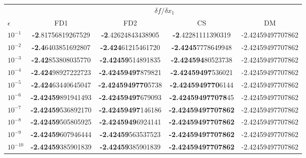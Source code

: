 \documentclass[letterpaper,12pt]{article}
\begin{document}
\begin{table}[h] %
\centering %
\begin{tabular}{p{1cm} c c c c} %
\toprule %
& \multicolumn{4}{c}{$\delta f / \delta x_1$} \\ %
\cmidrule{1-5} %
$\epsilon$ & FD1 & FD2 & CS & DM\\ %
\midrule %
$10^{-1}$ & {\bf-2}.81756819267529 & {\bf-2}.42624843438905 & {\bf-2}.42281111390319 & -2.42459497707862\\
$10^{-2}$ & {\bf-2.4}6403851692807 & {\bf-2.424}61215461720 & {\bf-2.4245}7778649948 & -2.42459497707862\\
$10^{-3}$ & {\bf-2.42}853808035770 & {\bf-2.42459}514891835 & {\bf-2.424594}80523738 & -2.42459497707862\\
$10^{-4}$ & {\bf-2.424}98927222723 & {\bf-2.42459497}879821 & {\bf-2.42459497}536021 & -2.42459497707862\\
$10^{-5}$ & {\bf-2.424}63440645047 & {\bf-2.4245949770}5738 & {\bf-2.4245949770}6144 & -2.42459497707862\\
$10^{-6}$ & {\bf-2.42459}891941493 & {\bf-2.42459497}679093 & {\bf-2.424594977078}45 & -2.42459497707862\\
$10^{-7}$ & {\bf-2.42459}536892170 & {\bf-2.42459497}146186 & {\bf-2.42459497707862} & -2.42459497707862\\
$10^{-8}$ & {\bf-2.42459}505805925 & {\bf-2.4245949}6924141 & {\bf-2.42459497707862} & -2.42459497707862\\
$10^{-9}$ & {\bf-2.42459}607946444 & {\bf-2.42459}563537523 & {\bf-2.42459497707862} & -2.42459497707862\\
$10^{-10}$ & {\bf-2.42459}385901839 &{\bf -2.42459}385901839 &{\bf -2.42459497707862} & -2.42459497707862\\

\end{tabular}
\end{table}
\end{document}
